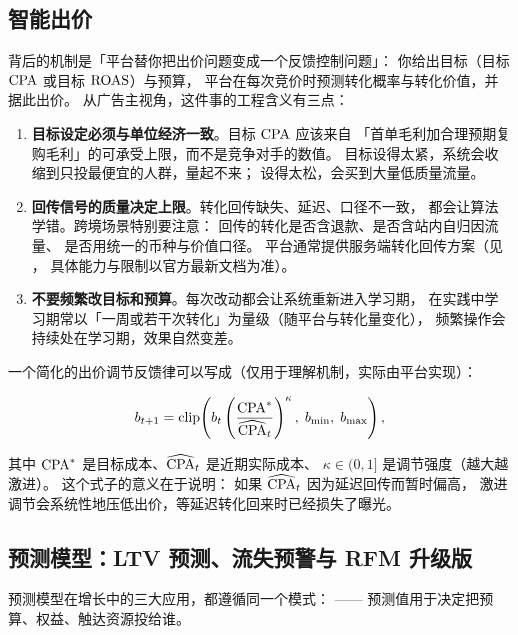 \subsection{智能出价}

 背后的机制是「平台替你把出价问题变成一个反馈控制问题」：
你给出目标（目标 $\operatorname{CPA}$ 或目标 $\operatorname{ROAS}$）与预算，
平台在每次竞价时预测转化概率与转化价值，并据此出价。
从广告主视角，这件事的工程含义有三点：

\begin{enumerate}
  \item \textbf{目标设定必须与单位经济一致}。目标 $\operatorname{CPA}$ 应该来自
        「首单毛利加合理预期复购毛利」的可承受上限，而不是竞争对手的数值。
        目标设得太紧，系统会收缩到只投最便宜的人群，量起不来；
        设得太松，会买到大量低质量流量。
  \item \textbf{回传信号的质量决定上限}。转化回传缺失、延迟、口径不一致，
        都会让算法学错。跨境场景特别要注意：
        回传的转化是否含退款、是否含站内自归因流量、
        是否用统一的币种与价值口径。
        平台通常提供服务端转化回传方案（见 \cite{meta_advantage}，
        具体能力与限制以官方最新文档为准）。
  \item \textbf{不要频繁改目标和预算}。每次改动都会让系统重新进入学习期，
        在实践中学习期常以「一周或若干次转化」为量级（随平台与转化量变化），
        频繁操作会持续处在学习期，效果自然变差。
\end{enumerate}

一个简化的出价调节反馈律可以写成（仅用于理解机制，实际由平台实现）：

\begin{equation}
b_{t+1} = \mathrm{clip}\!\left(
b_t \left( \frac{\operatorname{CPA}^{*}}{\widehat{\operatorname{CPA}}_t} \right)^{\kappa},\;
b_{\min},\; b_{\max} \right),
\label{eq:growth-bid-control}
\end{equation}

其中 $\operatorname{CPA}^{*}$ 是目标成本、$\widehat{\operatorname{CPA}}_t$ 是近期实际成本、
$\kappa \in (0,1]$ 是调节强度（越大越激进）。
这个式子的意义在于说明：
如果 $\widehat{\operatorname{CPA}}_t$ 因为延迟回传而暂时偏高，
激进调节会系统性地压低出价，等延迟转化回来时已经损失了曝光。

\subsection{预测模型：LTV 预测、流失预警与 RFM 升级版}

预测模型在增长中的三大应用，都遵循同一个模式：
——
预测值用于决定把预算、权益、触达资源投给谁。

